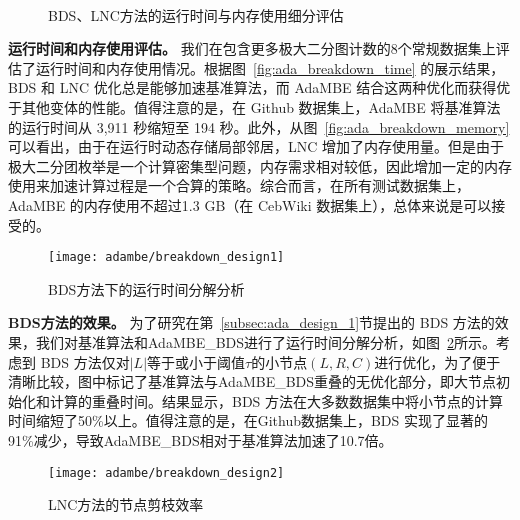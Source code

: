\begin{figure} [H]
  \centering
	\\

  \caption{BDS、LNC方法的运行时间与内存使用细分评估}
  \label{fig:ada_breakdown}
\end{figure}

\textbf{运行时间和内存使用评估。} 我们在包含更多极大二分图计数的8个常规数据集上评估了运行时间和内存使用情况。根据图~\ref{fig:ada_breakdown_time} 的展示结果，BDS 和 LNC 优化总是能够加速基准算法，而 AdaMBE 结合这两种优化而获得优于其他变体的性能。值得注意的是，在 Github 数据集上，AdaMBE 将基准算法的运行时间从 3,911 秒缩短至 194 秒。此外，从图~\ref{fig:ada_breakdown_memory} 可以看出，由于在运行时动态存储局部邻居，LNC 增加了内存使用量。但是由于极大二分团枚举是一个计算密集型问题，内存需求相对较低，因此增加一定的内存使用来加速计算过程是一个合算的策略。综合而言，在所有测试数据集上，AdaMBE 的内存使用不超过1.3 GB（在 CebWiki 数据集上），总体来说是可以接受的。

\begin{figure} [H]
	\centering
	\texttt{[image: adambe/breakdown\_design1]}
	\caption{BDS方法下的运行时间分解分析}

	\label{fig:ada_breakdown_design1}
\end{figure}

\textbf{BDS方法的效果。} 为了研究在第~\ref{subsec:ada_design_1}节提出的 BDS 方法的效果，我们对基准算法和AdaMBE\_BDS进行了运行时间分解分析，如图~\ref{fig:ada_breakdown_design1}所示。考虑到 BDS 方法仅对$|L|$等于或小于阈值$\tau$的小节点$(L, R, C)$进行优化，为了便于清晰比较，图中标记了基准算法与AdaMBE\_BDS重叠的无优化部分，即大节点初始化和计算的重叠时间。结果显示，BDS 方法在大多数数据集中将小节点的计算时间缩短了50\%以上。值得注意的是，在Github数据集上，BDS 实现了显著的91\%减少，导致AdaMBE\_BDS相对于基准算法加速了10.7倍。

\begin{figure} [H]
	\centering
	\texttt{[image: adambe/breakdown\_design2]}
	\caption{LNC方法的节点剪枝效率}

	\label{fig:ada_breakdown_design2}
\end{figure}

